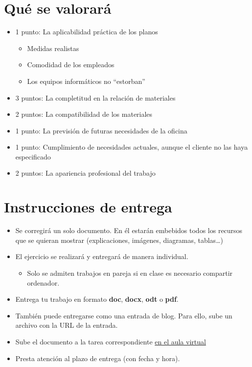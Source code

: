 \documentclass{article}
\begin{document}
\section{Qué se valorará}
\label{sec:org0000009}
\begin{itemize}
\item 1 punto: La aplicabilidad práctica de los planos
\begin{itemize}
\item Medidas realistas
\item Comodidad de los empleados
\item Los equipos informáticos no ``estorban''
\end{itemize}
\item 3 puntos: La completitud en la relación de materiales
\item 2 puntos: La compatibilidad de los materiales
\item 1 punto: La previsión de futuras necesidades de la oficina
\item 1 punto: Cumplimiento de necesidades actuales, aunque el cliente no las haya especificado
\item 2 puntos: La apariencia profesional del trabajo
\end{itemize}


\section{Instrucciones de entrega}
\label{sec:org000000c}
\begin{itemize}
\item Se corregirá un solo documento. En él estarán embebidos todos los recursos que se quieran mostrar (explicaciones, imágenes, diagramas, tablas\ldots{})
\item El ejercicio se realizará y entregará de manera individual.
\begin{itemize}
\item Solo se admiten trabajos en pareja si en clase es necesario compartir ordenador.
\end{itemize}
\item Entrega tu trabajo en formato \textbf{doc}, \textbf{docx}, \textbf{odt} o \textbf{pdf}.
\item También puede entregarse como una entrada de blog. Para ello, sube un archivo con la URL de la entrada.
\item Sube el documento a la tarea correspondiente \href{https://aulavirtual3.educa.madrid.org/ies.alonsodeavellan.alcala}{en el aula virtual}
\item Presta atención al plazo de entrega (con fecha y hora).
\end{itemize}
\end{document}
